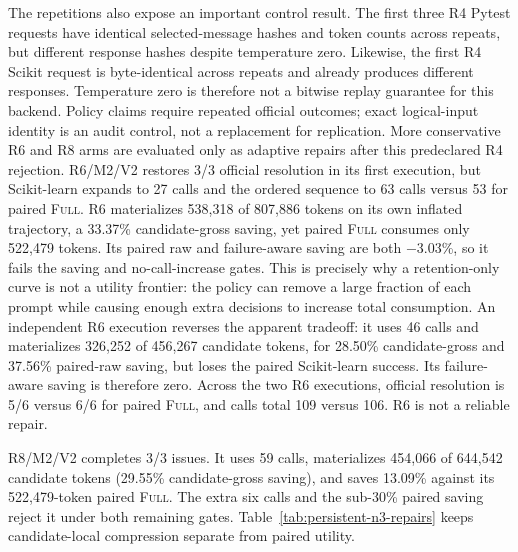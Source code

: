 \documentclass[11pt]{article}
\begin{document}
The repetitions also expose an important control result.  The first three
R4 Pytest requests have identical selected-message hashes and token counts
across repeats, but different response hashes despite temperature zero.
Likewise, the first R4 Scikit request is byte-identical across repeats and
already produces different responses.  Temperature zero is therefore not a
bitwise replay guarantee for this backend.  Policy claims require repeated
official outcomes; exact logical-input identity is an audit control, not a
replacement for replication.  More conservative R6 and R8 arms are evaluated
only as adaptive repairs after this predeclared R4 rejection.  R6/M2/V2
restores 3/3 official resolution in its first execution, but Scikit-learn
expands to 27 calls and the ordered sequence to 63 calls versus 53 for paired
\textsc{Full}.  R6
materializes 538,318 of 807,886 tokens on its own inflated trajectory, a
33.37\% candidate-gross saving, yet paired \textsc{Full} consumes only 522,479
tokens.  Its paired raw and failure-aware saving are both $-3.03$\%, so it
fails the saving and no-call-increase gates.  This is precisely why a
retention-only curve is not a utility frontier: the policy can remove a large
fraction of each prompt while causing enough extra decisions to increase total
consumption.  An independent R6 execution reverses the apparent tradeoff: it
uses 46 calls and materializes 326,252 of 456,267 candidate tokens, for
28.50\% candidate-gross and 37.56\% paired-raw saving, but loses the paired
Scikit-learn success.  Its failure-aware saving is therefore zero.  Across
the two R6 executions, official resolution is 5/6 versus 6/6 for paired
\textsc{Full}, and calls total 109 versus 106.  R6 is not a reliable repair.

R8/M2/V2 completes 3/3 issues.  It uses 59 calls, materializes 454,066 of
644,542 candidate tokens (29.55\% candidate-gross saving), and saves 13.09\%
against its 522,479-token paired \textsc{Full}.  The extra six calls and the
sub-30\% paired saving reject it under both remaining gates.  Table~\ref{tab:persistent-n3-repairs}
keeps candidate-local compression separate from paired utility.
\end{document}
